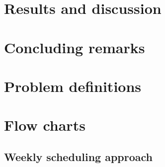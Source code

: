 \documentclass[a4paper, 10pt, twoside, openright]{book}
\begin{document}


%
%

\chapter{Results and discussion}\label{chap:res}


%

\chapter{Concluding remarks}\label{chap:concl}







\appendix
\chapter{Problem definitions} \label{definitions}







\chapter{Flow charts} \label{appendix:flow_charts}


\section{Weekly scheduling approach}
\end{document}

